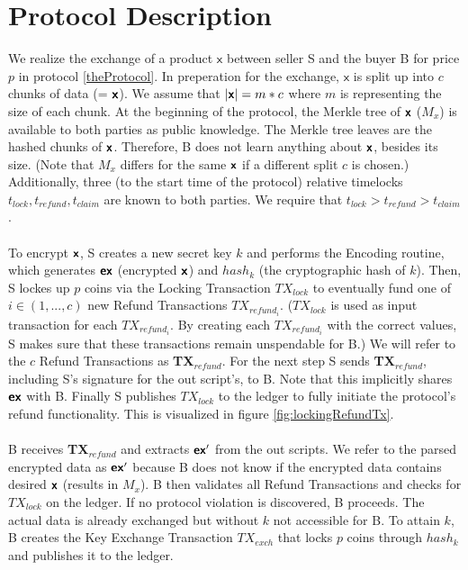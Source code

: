 \documentclass{cacthesis}
\newcounter{protocol}
\begin{document}
        \section{Protocol Description}
        We realize the exchange of a product $\textsf{x}$ between seller S and the buyer B for price $p$ in protocol \ref{theProtocol}. In preperation for the exchange, $\textsf{x}$ is split up into $c$ chunks of data (= $\textsf{\textbf{x}}$). We assume that $|\textsf{\textbf{x}}| = m*c $ where $m$ is representing the size of each chunk. At the beginning of the protocol, the Merkle tree of $\textsf{\textbf{x}}$ ($M_x$) is available to both parties as public knowledge. The Merkle tree leaves are the hashed chunks of $\textsf{\textbf{x}}$. Therefore, B does not learn anything about $\textsf{\textbf{x}}$, besides its size. (Note that $M_x$ differs for the same $\textsf{\textbf{x}}$ if a different split $c$ is chosen.) Additionally, three (to the start time of the protocol) relative timelocks $t_{lock}, t_{refund}, t_{claim}$ are known to both parties. We require that $t_{lock} > t_{refund} > t_{claim}$. \\\\
        To encrypt $\textsf{\textbf{x}}$, S creates a new secret key $k$ and performs the Encoding routine, which generates $\textsf{\textbf{ex}}$ (encrypted $\textsf{\textbf{x}}$) and $hash_k$ (the cryptographic hash of $k$). Then, S lockes up $p$ coins via the Locking Transaction $TX_{lock}$ to eventually fund one of $i \in (1, ..., c)$ new Refund Transactions $TX_{{refund}_i}$. ($TX_{lock}$  is used as input transaction for each $TX_{{refund}_i}$. By creating each $TX_{{refund}_i}$ with the correct values, S makes sure that these transactions remain unspendable for B.) We will refer to the $c$ Refund Transactions as \textbf{TX$_{{refund}}$}. For the next step S sends \textbf{TX$_{{refund}}$}, including S's signature for the out script's, to B. Note that this implicitly shares $\textsf{\textbf{ex}}$ with B. Finally S publishes $TX_{lock}$ to the ledger to fully initiate the protocol's refund functionality. This is visualized in figure \ref{fig:lockingRefundTx}. \\\\
        B receives \textbf{TX$_{{refund}}$} and extracts $\textsf{\textbf{ex}}'$ from the out scripts. We refer to the parsed encrypted data as $\textsf{\textbf{ex}}'$ because B does not know if the encrypted data contains desired $\textsf{\textbf{x}}$ (results in $M_x$). B then validates all Refund Transactions and checks for $TX_{lock}$ on the ledger. If no protocol violation is discovered, B proceeds. The actual data is already exchanged but without $k$ not accessible for B. To attain $k$, B creates the Key Exchange Transaction $TX_{exch}$ that locks $p$ coins through $hash_k$ and publishes it to the ledger. \\\\
\end{document}
